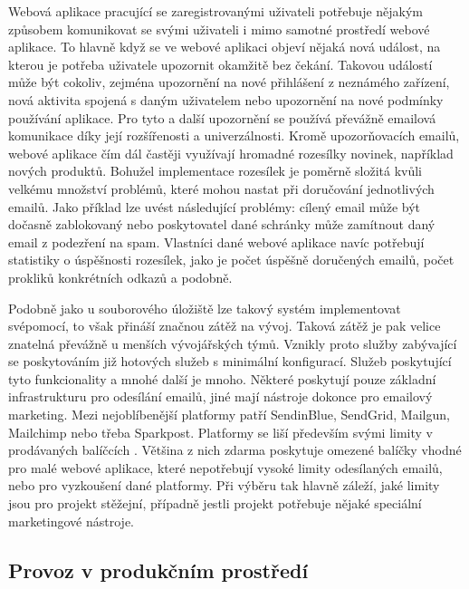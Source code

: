 	Webová aplikace pracující se zaregistrovanými uživateli potřebuje nějakým způsobem komunikovat se svými uživateli i
	mimo samotné prostředí webové aplikace.
	To hlavně když se ve webové aplikaci objeví nějaká nová událost, na kterou je potřeba uživatele upozornit
	okamžitě bez čekání.
	Takovou událostí může být cokoliv, zejména upozornění na nové přihlášení z neznámého zařízení, nová aktivita spojená
	s daným uživatelem nebo upozornění na nové podmínky používání aplikace.
	Pro tyto a další upozornění se používá převážně emailová komunikace díky její rozšířenosti a univerzálnosti.
	Kromě upozorňovacích emailů, webové aplikace čím dál častěji využívají hromadné rozesílky novinek,
	například nových produktů.
	Bohužel implementace rozesílek je poměrně složitá kvůli velkému množství problémů, které mohou nastat
	při doručování jednotlivých emailů.
	Jako příklad lze uvést následující problémy: cílený email může být dočasně zablokovaný nebo
	poskytovatel dané schránky může zamítnout daný email z podezření na spam.
	Vlastníci dané webové aplikace navíc potřebují statistiky o úspěšnosti rozesílek, jako je počet úspěšně doručených emailů,
	počet prokliků konkrétních odkazů a podobně.

	Podobně jako u souborového úložiště lze takový systém implementovat svépomocí, to však přináší značnou zátěž na vývoj.
	Taková zátěž je pak velice znatelná převážně u menších vývojářských týmů.
	Vznikly proto služby zabývající se poskytováním již hotových služeb s minimální konfigurací.
	Služeb poskytující tyto funkcionality a mnohé další je mnoho.
	Některé poskytují pouze základní infrastrukturu pro odesílání emailů, jiné mají nástroje dokonce pro emailový
	marketing.
	Mezi nejoblíbenější platformy patří SendinBlue, SendGrid, Mailgun, Mailchimp nebo třeba Sparkpost.
	Platformy se liší především svými limity v prodávaných balíčcích \cite{maily_1} \cite{maily_2}.
	Většina z nich zdarma poskytuje omezené balíčky vhodné pro malé webové aplikace, které nepotřebují vysoké limity odesílaných
	emailů, nebo pro vyzkoušení dané platformy.
	Při výběru tak hlavně záleží, jaké limity jsou pro projekt stěžejní, případně jestli projekt potřebuje nějaké speciální
	marketingové nástroje.

	\subsection{Provoz v produkčním prostředí}

